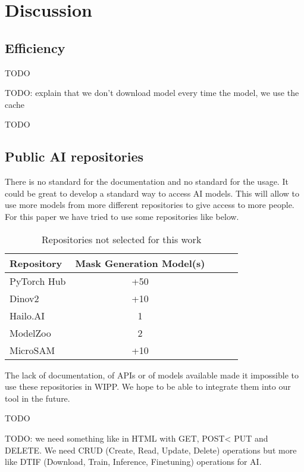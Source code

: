 \section{Discussion}
\label{sec:discussion}

\subsection{Efficiency}


TODO

TODO: explain that we don't download model every time the model, we use the cache

TODO


\subsection{Public AI repositories}

There is no standard for the documentation and no standard for the usage.
It could be great to develop a standard
way to access AI models. This will allow to use more models from more different
repositories to give access to more people. For this paper we have tried to use
some repositories like below.

\begin{table}[H]
    \centering
    \caption{\label{tab:discussion}%
        Repositories not selected for this work
    }
    \begin{tabular}{lcccc}
      \toprule
      Repository & Mask Generation Model(s) \\
      \midrule
      PyTorch Hub & +50 \\
      Dinov2 & +10 \\
      Hailo.AI & 1 \\
      ModelZoo & 2 \\
      MicroSAM & +10 \\
      \bottomrule
    \end{tabular}
\end{table}

The lack of documentation, of APIs or of models available made it impossible to
use these repositories in WIPP. We hope to be able to integrate them into our
tool in the future.


TODO

TODO: we need something like in HTML with GET, POST< PUT and DELETE. We need CRUD  (Create, Read, Update, Delete) operations
but more like DTIF (Download, Train, Inference, Finetuning) operations for AI.

